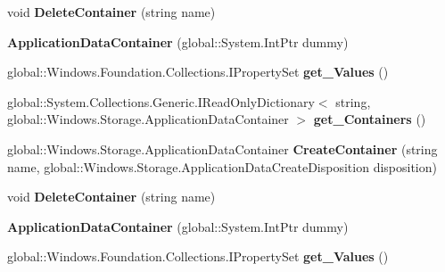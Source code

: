 \begin{DoxyCompactItemize}
void {\bfseries Delete\+Container} (string name)
\item 
\mbox{\label{class_windows_1_1_storage_1_1_application_data_container_a0649013a245656d416ecc5a7f192010b}} 
{\bfseries Application\+Data\+Container} (global\+::\+System.\+Int\+Ptr dummy)
\item 
\mbox{\label{class_windows_1_1_storage_1_1_application_data_container_a3c0afb245420d44945e67800bf1aae9f}} 
global\+::\+Windows.\+Foundation.\+Collections.\+I\+Property\+Set {\bfseries get\+\_\+\+Values} ()
\item 
\mbox{\label{class_windows_1_1_storage_1_1_application_data_container_a361c8478595cda5b8019768201c65b27}} 
global\+::\+System.\+Collections.\+Generic.\+I\+Read\+Only\+Dictionary$<$ string, global\+::\+Windows.\+Storage.\+Application\+Data\+Container $>$ {\bfseries get\+\_\+\+Containers} ()
\item 
\mbox{\label{class_windows_1_1_storage_1_1_application_data_container_ad7aefe4a6e2c696f8ac1044c1649ab0a}} 
global\+::\+Windows.\+Storage.\+Application\+Data\+Container {\bfseries Create\+Container} (string name, global\+::\+Windows.\+Storage.\+Application\+Data\+Create\+Disposition disposition)
\item 
\mbox{\label{class_windows_1_1_storage_1_1_application_data_container_ae10280581ba75a8732781e66d0037ef0}} 
void {\bfseries Delete\+Container} (string name)
\item 
\mbox{\label{class_windows_1_1_storage_1_1_application_data_container_a0649013a245656d416ecc5a7f192010b}} 
{\bfseries Application\+Data\+Container} (global\+::\+System.\+Int\+Ptr dummy)
\item 
\mbox{\label{class_windows_1_1_storage_1_1_application_data_container_a3c0afb245420d44945e67800bf1aae9f}} 
global\+::\+Windows.\+Foundation.\+Collections.\+I\+Property\+Set {\bfseries get\+\_\+\+Values} ()

\end{DoxyCompactItemize}
